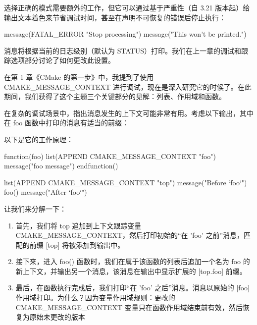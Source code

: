 选择正确的模式需要额外的工作，但它可以通过基于严重性（自 3.21 版本起）给输出文本着色来节省调试时间，甚至在声明不可恢复的错误后停止执行：


\begin{cmake}
message(FATAL_ERROR "Stop processing")
message("This won't be printed.")
\end{cmake}

消息将根据当前的日志级别（默认为 STATUS）打印。我们在上一章的调试和跟踪选项部分讨论了如何更改此设置。

在第 1 章《CMake 的第一步》中，我提到了使用 CMAKE\_MESSAGE\_CONTEXT 进行调试，现在是深入研究它的时候了。在此期间，我们获得了这个主题三个关键部分的见解：列表、作用域和函数。

在复杂的调试场景中，指出消息发生的上下文可能非常有用。考虑以下输出，其中在 foo 函数中打印的消息有适当的前缀：


以下是它的工作原理：


\begin{cmake}
function(foo)
    list(APPEND CMAKE_MESSAGE_CONTEXT "foo")
    message("foo message")
endfunction()

list(APPEND CMAKE_MESSAGE_CONTEXT "top")
message("Before `foo`")
foo()
message("After `foo`")
\end{cmake}

让我们来分解一下：

\begin{enumerate}
\item
首先，我们将 top 追加到上下文跟踪变量 CMAKE\_MESSAGE\_CONTEXT，然后打印初始的“在 'foo' 之前”消息，匹配的前缀 [top] 将被添加到输出中。

\item
接下来，进入 foo() 函数时，我们在属于该函数的列表后追加一个名为 foo 的新上下文，并输出另一个消息，该消息在输出中显示扩展的 [top.foo] 前缀。

\item
最后，在函数执行完成后，我们打印“在 'foo' 之后”消息。消息以原始的 [foo] 作用域打印。为什么？因为变量作用域规则：更改的 CMAKE\_MESSAGE\_CONTEXT 变量只在函数作用域结束前有效，然后恢复为原始未更改的版本
\end{enumerate}


